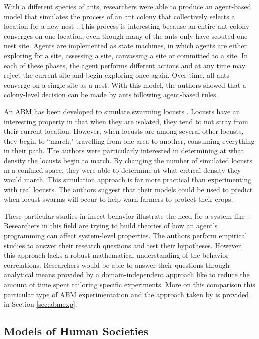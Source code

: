 With a different species of ants, researchers were able to produce an agent-based model that simulates the process of an ant colony that collectively selects a location for a new nest \cite{pratt2005agent}.
This process is interesting because an entire ant colony converges on one location, even though many of the ants only have scouted one nest site.
Agents are implemented as state machines, in which agents are either exploring for a site, assessing a site, canvassing a site or committed to a site.
In each of these phases, the agent performs different actions and at any time may reject the current site and begin exploring once again.
Over time, all ants converge on a single site as a nest.
With this model, the authors showed that a colony-level decision can be made by ants following agent-based rules.

An ABM has been developed to simulate swarming locusts \cite{buhl2006dom}.
Locusts have an interesting property in that when they are isolated, they tend to not stray from their current location.
However, when locusts are among several other locusts, they begin to ``march," travelling from one area to another, consuming everything in their path.
The authors were particularly interested in determining at what density the locusts  begin to march. By changing the number of simulated locusts in a confined space, they were able to determine at what critical density they would march.
This simulation approach is far more practical than experimenting with real locusts.
The authors suggest that their models could be used to predict when locust swarms will occur to help warn farmers to protect their crops.

These particular studies in insect behavior illustrate the need for a system like \fw.
Researchers in this field are trying to build theories of how an agent's programming can affect system-level properties.
The authors perform empirical studies to answer their research questions and test their hypotheses.
However, this approach lacks a robust mathematical understanding of the behavior correlations.
Researchers would be able to answer their questions through analytical means provided by a domain-independent approach like \fw to reduce the amount of time spent tailoring specific experiments.
More on this comparison this particular type of ABM experimentation and the approach taken by \fw is provided in Section \ref{sec:abmexp}.

\subsection{Models of Human Societies}

